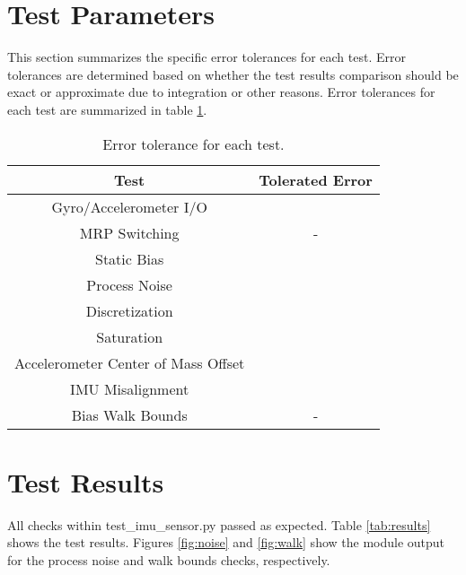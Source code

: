 \section{Test Parameters}
This section summarizes the specific error tolerances for each test. Error tolerances are determined based on whether the test results comparison should be exact or approximate due to integration or other reasons. Error tolerances for each test are summarized in table \ref{tab:errortol}. 

\begin{table}[H]
	\caption{Error tolerance for each test.}
	\label{tab:errortol}
	\centering \fontsize{10}{10}\selectfont
	\begin{tabular}{ c | c } %
		\hline
		\textbf{Test}   									& \textbf{Tolerated Error} 						  \\ \hline
		Gyro/Accelerometer I/O 						& 		   \\ \hline
		MRP Switching 									& - 														   \\ \hline
		Static Bias 										&  	 		       \\ \hline
		Process Noise 									& 			      \\ \hline
		Discretization 				  					   &   \\ \hline
		Saturation 											&  	  \\ \hline
		Accelerometer Center of Mass Offset &  \\ \hline
		IMU Misalignment 								&  \\ \hline
		Bias Walk Bounds 								& - 														   \\ \hline
	\end{tabular}
\end{table}


\section{Test Results}
All checks within test\_imu\_sensor.py passed as expected. Table \ref{tab:results} shows the test results. Figures \ref{fig:noise} and \ref{fig:walk} show the module output for the process noise and walk bounds checks, respectively.

